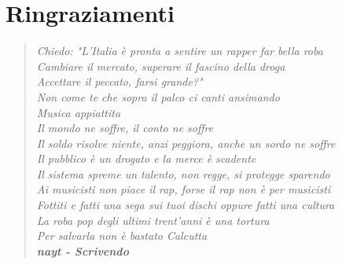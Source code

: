 \titlespacing*{\chapter}{0pt}{-30pt}{15pt}
\chapter*{Ringraziamenti}


\begin{quote}
\slshape\fontsize{9pt}{12pt}\selectfont
Chiedo: "L'Italia è pronta a sentire un rapper far bella roba \\
Cambiare il mercato, superare il fascino della droga \\
Accettare il peccato, farsi grande?" \\
Non come te che sopra il palco ci canti ansimando \\
Musica appiattita \\
Il mondo ne soffre, il conto ne soffre\\
Il soldo risolve niente, anzi peggiora, anche un sordo ne soffre\\
Il pubblico è un drogato e la merce è scadente\\
Il sistema spreme un talento, non regge, si protegge sparendo\\
Ai musicisti non piace il rap, forse il rap non è per musicisti\\
Fottiti e fatti una sega sui tuoi dischi oppure fatti una cultura\\
La roba pop degli ultimi trent’anni è una tortura \\
Per salvarla non è bastato Calcutta \\
[0.15cm]
\hspace*{1.5cm}\upshape\textbf{nayt - Scrivendo}
\end{quote}


